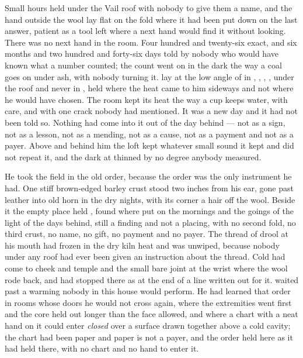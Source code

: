 
Small hours held under the Vail roof with nobody to give them a name, and the hand outside the wool lay flat on the fold where it had been put down on the last answer, patient as a tool left where a next hand would find it without looking. There was no next hand in the room. Four hundred and twenty-six exact, and six months and two hundred and forty-six days told by nobody who would have known what a number counted; the count went on in the dark the way a coal goes on under ash, with nobody turning it.  lay at the low angle of  in , , , , under the roof and never in , held where the heat came to him sideways and not where he would have chosen. The room kept its heat the way a cup keeps water, with care, and with one crack nobody had mentioned. It was a new day and it had not been told so. Nothing had come into it out of the day behind --- not as a sign, not as a lesson, not as a mending, not as a cause, not as a payment and not as a payer. Above and behind him the loft kept whatever small sound it kept and did not repeat it, and the dark at  thinned by no degree anybody measured.

He took the field in the old order, because the order was the only instrument he had. One stiff brown-edged barley crust stood two inches from his ear, gone past leather into old horn in the dry nights, with its corner a hair off the wool. Beside it the empty place held , found where put on the mornings and the goings of the light of the days behind, still a finding and not a placing, with no second fold, no third crust, no name, no gift, no payment and no payer. The thread of drool at his mouth had frozen in the dry kiln heat and was unwiped, because nobody under any roof had ever been given an instruction about the thread. Cold had come to cheek and temple and the small bare joint at the wrist where the wool rode back, and had stopped there as at the end of a line written out for it.  waited past a warming nobody in this house would perform. He had learned that order in rooms whose doors he would not cross again, where the extremities went first and the core held out longer than the face allowed, and where a chart with a neat hand on it could enter \emph{closed} over a surface drawn together above a cold cavity; the chart had been paper and paper is not a payer, and the order held here as it had held there, with no chart and no hand to enter it.

